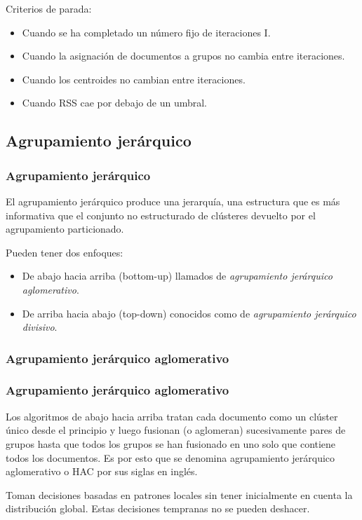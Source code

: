 \documentclass[t,compress,10pt,xcolor=dvipsnames]{beamer}
\begin{document}
{	\vspace{1em}
	Criterios de parada:
	\begin{itemize}
		\item Cuando se ha completado un número fijo de iteraciones I. 
		\item Cuando la asignación de documentos a grupos no cambia entre iteraciones.
		\item Cuando los centroides no cambian entre iteraciones.
		\item Cuando RSS cae por debajo de un umbral.
	\end{itemize}
}

	\subsection{Agrupamiento jer\'arquico}
	\frame
	{
		\frametitle{Agrupamiento jer\'arquico}
		\vspace{2em}
		El agrupamiento jerárquico produce una jerarquía, una estructura que es más informativa que el conjunto no estructurado de clústeres devuelto por el agrupamiento particionado.
		
		\vspace{1em}
		Pueden tener dos enfoques: 
		\begin{itemize}
			\item De abajo hacia arriba (bottom-up) llamados de \textit{agrupamiento jer\'arquico aglomerativo}. 
			\item De arriba hacia abajo (top-down) conocidos como de \textit{agrupamiento jer\'arquico divisivo}. 
		\end{itemize}
	}
	
	
	\subsubsection{Agrupamiento jer\'arquico aglomerativo}
	\frame
	{
		\frametitle{Agrupamiento jer\'arquico aglomerativo}
		\vspace{3em}
		Los algoritmos de abajo hacia arriba tratan cada documento como un clúster único desde el principio y luego fusionan (o aglomeran) sucesivamente pares de grupos hasta que todos los grupos se han fusionado en uno solo que contiene todos los documentos. 
		Es por esto que se denomina agrupamiento jerárquico aglomerativo o HAC por sus siglas en ingl\'es. 
		
		\vspace{1em}
		Toman decisiones basadas en patrones locales sin tener inicialmente en cuenta la distribución global. Estas decisiones tempranas no se pueden deshacer.
	}
\end{document}
